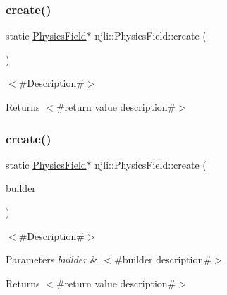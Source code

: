 \subsubsection{\texorpdfstring{create()}{create()}\hspace{0.1cm}{\footnotesize\ttfamily [2/3]}}
{\footnotesize\ttfamily static \mbox{\hyperlink{classnjli_1_1_physics_field}{Physics\+Field}}$\ast$ njli\+::\+Physics\+Field\+::create (\begin{DoxyParamCaption}{ }\end{DoxyParamCaption})\hspace{0.3cm}{\ttfamily [static]}}

$<$\#\+Description\#$>$

\begin{DoxyReturn}{Returns}
$<$\#return value description\#$>$ 
\end{DoxyReturn}
\mbox{\label{classnjli_1_1_physics_field_a888c01a315f5470a00e7f77d9b9a7f64}} 
\subsubsection{\texorpdfstring{create()}{create()}\hspace{0.1cm}{\footnotesize\ttfamily [3/3]}}
{\footnotesize\ttfamily static \mbox{\hyperlink{classnjli_1_1_physics_field}{Physics\+Field}}$\ast$ njli\+::\+Physics\+Field\+::create (\begin{DoxyParamCaption}\item[{const \mbox{\hyperlink{classnjli_1_1_physics_field_builder}{Physics\+Field\+Builder}} \&}]{builder }\end{DoxyParamCaption})\hspace{0.3cm}{\ttfamily [static]}}

$<$\#\+Description\#$>$


\begin{DoxyParams}{Parameters}
{\em builder} & $<$\#builder description\#$>$\\
\hline
\end{DoxyParams}
\begin{DoxyReturn}{Returns}
$<$\#return value description\#$>$ 
\end{DoxyReturn}
\mbox{\label{classnjli_1_1_physics_field_a4646a470388fbb4fd5f405d911e31bb0}} 
